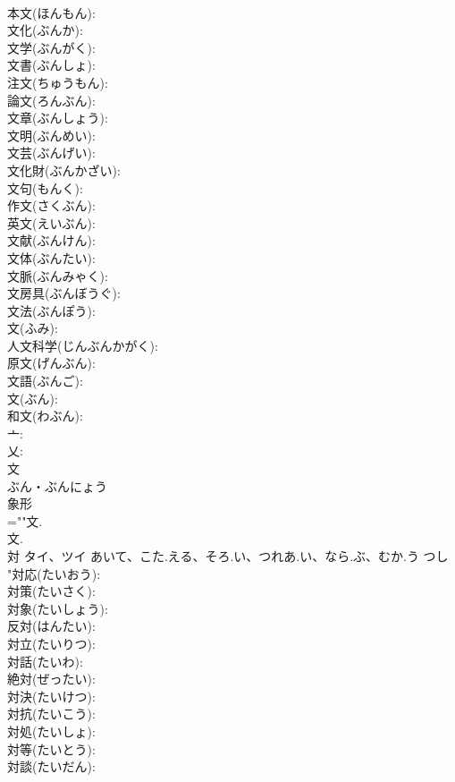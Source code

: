 \documentclass[8pt]{extreport}
\begin{document}
\begin{CJK}{UTF8}{min}
\\	本文(ほんもん): 
\\	文化(ぶんか): 
\\	文学(ぶんがく): 
\\	文書(ぶんしょ): 
\\	注文(ちゅうもん): 
\\	論文(ろんぶん): 
\\	文章(ぶんしょう): 
\\	文明(ぶんめい): 
\\	文芸(ぶんげい): 
\\	文化財(ぶんかざい): 
\\	文句(もんく): 
\\	作文(さくぶん): 
\\	英文(えいぶん): 
\\	文献(ぶんけん): 
\\	文体(ぶんたい): 
\\	文脈(ぶんみゃく): 
\\	文房具(ぶんぼうぐ): 
\\	文法(ぶんぽう): 
\\	文(ふみ): 
\\	人文科学(じんぶんかがく): 
\\	原文(げんぶん): 
\\	文語(ぶんご): 
\\	文(ぶん): 
\\	和文(わぶん): 
\\	亠: 
\\	乂: 
\\	文	
\\	ぶん・ぶんにょう	
\\	象形 
\\	=""文.
\\	文.
\\	対	タイ、ツイ	あいて、こた.える、そろ.い、つれあ.い、なら.ぶ、むか.う	つし	
\\	"対応(たいおう): 
\\	対策(たいさく): 
\\	対象(たいしょう): 
\\	反対(はんたい): 
\\	対立(たいりつ): 
\\	対話(たいわ): 
\\	絶対(ぜったい): 
\\	対決(たいけつ): 
\\	対抗(たいこう): 
\\	対処(たいしょ): 
\\	対等(たいとう): 
\\	対談(たいだん): 

\end{CJK}
\end{document}
